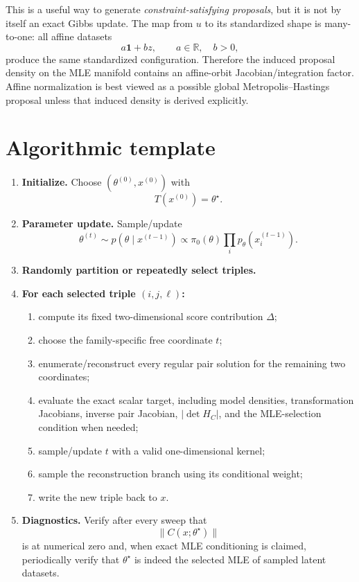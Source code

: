 \documentclass[11pt]{article}
\newcommand{\R}{\mathbb{R}}
\newcommand{\1}{\mathbf{1}}
\begin{document}
This is a useful way to generate \emph{constraint-satisfying proposals}, but it is not by itself an exact Gibbs update.  The map from $u$ to its standardized shape is many-to-one: all affine datasets
\[
    a\mathbf 1+bz,
    \qquad a\in\R,\quad b>0,
\]
produce the same standardized configuration.  Therefore the induced proposal density on the MLE manifold contains an affine-orbit Jacobian/integration factor.  Affine normalization is best viewed as a possible global Metropolis--Hastings proposal unless that induced density is derived explicitly.

\section{Algorithmic template}

\begin{enumerate}[label=\textbf{Step \arabic*:},leftmargin=*]
    \item \textbf{Initialize.} Choose $(\theta^{(0)},x^{(0)})$ with
    \[
        T(x^{(0)})=\theta^\star.
    \]

    \item \textbf{Parameter update.} Sample/update
    \[
        \theta^{(t)}\sim p(\theta\mid x^{(t-1)})
        \propto \pi_0(\theta)\prod_i p_\theta(x_i^{(t-1)}).
    \]

    \item \textbf{Randomly partition or repeatedly select triples.}

    \item \textbf{For each selected triple $(i,j,\ell)$:}
    \begin{enumerate}[label=(\alph*)]
        \item compute its fixed two-dimensional score contribution $\Delta$;
        \item choose the family-specific free coordinate $t$;
        \item enumerate/reconstruct every regular pair solution for the remaining two coordinates;
        \item evaluate the exact scalar target, including model densities, transformation Jacobians, inverse pair Jacobian, $|\det H_C|$, and the MLE-selection condition when needed;
        \item sample/update $t$ with a valid one-dimensional kernel;
        \item sample the reconstruction branch using its conditional weight;
        \item write the new triple back to $x$.
    \end{enumerate}

    \item \textbf{Diagnostics.} Verify after every sweep that
    \[
        \|C(x;\theta^\star)\|
    \]
    is at numerical zero and, when exact MLE conditioning is claimed, periodically verify that $\theta^\star$ is indeed the selected MLE of sampled latent datasets.
\end{enumerate}
\end{document}
